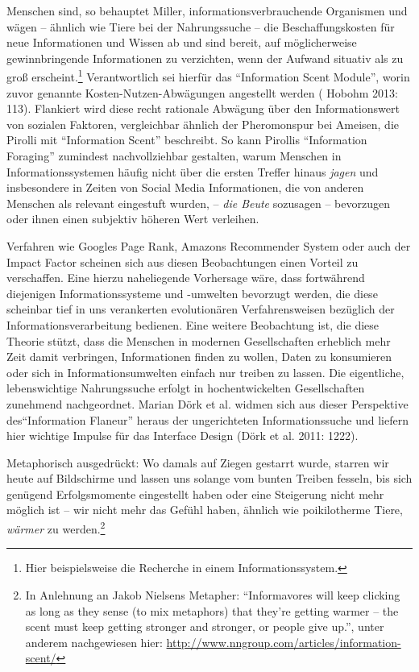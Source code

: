 \documentclass[a4paper,
fontsize=11pt,
oneside,
numbers=noperiodatend,
parskip=half-,
bibliography=totoc,
final
]{scrartcl}
\begin{document}
Menschen sind, so behauptet Miller, informationsverbrauchende Organismen
und wägen -- ähnlich wie Tiere bei der Nahrungssuche -- die
Beschaffungskosten für neue Informationen und Wissen ab und sind bereit,
auf möglicherweise gewinnbringende Informationen zu verzichten, wenn der
Aufwand situativ als zu groß erscheint.\footnote{Hier beispielsweise die
  Recherche in einem Informationssystem.} Verantwortlich sei hierfür das
\enquote{Information Scent Module}, worin zuvor genannte
Kosten-Nutzen-Abwägungen angestellt werden ( Hobohm 2013: 113).
Flankiert wird diese recht rationale Abwägung über den Informationswert
von sozialen Faktoren, vergleichbar ähnlich der Pheromonspur bei
Ameisen, die Pirolli mit \enquote{Information Scent} beschreibt. So kann
Pirollis \enquote{Information Foraging} zumindest nachvollziehbar
gestalten, warum Menschen in Informationssystemen häufig nicht über die
ersten Treffer hinaus \emph{jagen} und insbesondere in Zeiten von Social
Media Informationen, die von anderen Menschen als relevant eingestuft
wurden, -- \emph{die Beute} sozusagen -- bevorzugen oder ihnen einen
subjektiv höheren Wert verleihen.

Verfahren wie Googles Page Rank, Amazons Recommender System oder auch
der Impact Factor scheinen sich aus diesen Beobachtungen einen Vorteil
zu verschaffen. Eine hierzu naheliegende Vorhersage wäre, dass
fortwährend diejenigen Informationssysteme und -umwelten bevorzugt
werden, die diese scheinbar tief in uns verankerten evolutionären
Verfahrensweisen bezüglich der Informationsverarbeitung bedienen. Eine
weitere Beobachtung ist, die diese Theorie stützt, dass die Menschen in
modernen Gesellschaften erheblich mehr Zeit damit verbringen,
Informationen finden zu wollen, Daten zu konsumieren oder sich in
Informationsumwelten einfach nur treiben zu lassen. Die eigentliche,
lebenswichtige Nahrungssuche erfolgt in hochentwickelten Gesellschaften
zunehmend nachgeordnet. Marian Dörk et al. widmen sich aus dieser
Perspektive des\enquote{Information Flaneur} heraus der ungerichteten
Informationssuche und liefern hier wichtige Impulse für das Interface
Design (Dörk et al. 2011: 1222).

Metaphorisch ausgedrückt: Wo damals auf Ziegen gestarrt wurde, starren
wir heute auf Bildschirme und lassen uns solange vom bunten Treiben
fesseln, bis sich genügend Erfolgsmomente eingestellt haben oder eine
Steigerung nicht mehr möglich ist -- wir nicht mehr das Gefühl haben,
ähnlich wie poikilotherme Tiere, \emph{wärmer} zu werden.\footnote{In
  Anlehnung an Jakob Nielsens Metapher: \enquote{Informavores will keep
  clicking as long as they sense (to mix metaphors) that they're getting
  warmer -- the scent must keep getting stronger and stronger, or people
  give up.}, unter anderem nachgewiesen hier:
  \url{http://www.nngroup.com/articles/information-scent/}}
\end{document}
